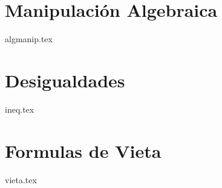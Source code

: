 \chapter{Manipulaci\'on Algebraica}
{algmanip.tex}


\chapter{Desigualdades}
{ineq.tex}


\chapter{Formulas de Vieta}
{vieta.tex}
